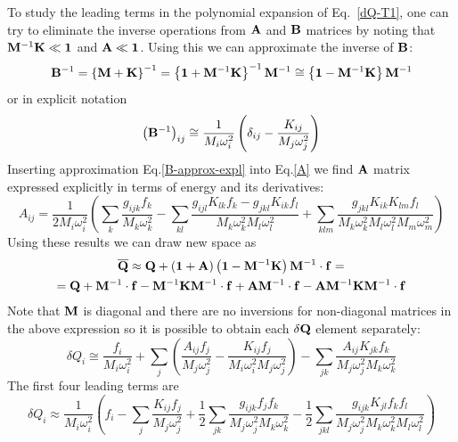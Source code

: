 \documentclass[a4paper,titlepage,twoside,fleqn,12pt]{book}
\begin{document}
\begin{refsection}
To study the leading terms in the polynomial expansion of Eq.~\eqref{dQ-T1}, 
one can try to eliminate the inverse operations from ${\bf A}$ and ${\bf B}$ matrices by noting that
${\bf M}^{-1} {\bf K} \ll {\bf 1}$ and ${\bf A} \ll {\bf 1}$. 
Using this we can approximate the inverse of ${\bf B}$:
%
\begin{equation}\label{B-approx}
{\bf B}^{-1} = \left\{ {\bf M} + {\bf K} \right\}^{-1} 
= \left\{ {\bf 1} + {\bf M}^{-1}{\bf K} \right\}^{-1}{\bf M}^{-1}
\cong \left\{ {\bf 1} - {\bf M}^{-1}{\bf K} \right\}{\bf M}^{-1}
\end{equation}
%
or in explicit notation
%
\begin{equation}\label{B-approx-expl}
\left( {\bf B}^{-1} \right)_{ij} \cong
\frac{1}{M_i\omega_i^2} \left( \delta_{ij} - \frac{K_{ij}}{M_j\omega_j^2} \right)
\end{equation}
%
Inserting approximation Eq.\eqref{B-approx-expl} into Eq.\eqref{A} we find
${\bf A}$ matrix expressed explicitly in terms of energy and its derivatives:
%
\begin{equation}\label{A-approx-expl}
A_{ij} = \frac{1}{2M_i\omega_i^2} 
\left(
     \sum_k \frac{g_{ijk}f_k}{M_k\omega_k^2} -
     \sum_{kl} \frac{ g_{ijl} K_{lk} f_k - g_{jkl} K_{ik} f_l }
                    {M_k\omega_k^2 M_l\omega_l^2} +
     \sum_{klm} \frac{ g_{jkl} K_{ik} K_{lm} f_l }
                     {M_k\omega_k^2 M_l\omega_l^2 M_m\omega_m^2}
\right)
\end{equation}
%
Using these results we can draw new space as
\begin{multline}\label{Q-new-T2-approx}
{\bf \overline{Q}} \approx {\bf Q} + \left( {\bf 1} + {\bf A} \right) \left( {\bf 1} - {\bf M}^{-1}{\bf K} \right){\bf M}^{-1} \cdot {\bf f}
= \\
={\bf Q} + {\bf M}^{-1} \cdot {\bf f} - {\bf M}^{-1}{\bf K}{\bf M}^{-1}\cdot{\bf f}
+ {\bf A}{\bf M}^{-1}\cdot{\bf f} - {\bf A}{\bf M}^{-1}{\bf K}{\bf M}^{-1}\cdot{\bf f}
\end{multline}
%
Note that ${\bf M}$ is diagonal and there are no inversions 
for non-diagonal matrices in the above expression
so it is possible to obtain each $\delta{\bf Q}$
element separately:
%
\begin{equation}\label{dQ-approx-T1-expl}
\delta Q_i \cong \frac{f_i}{M_i\omega_i^2} + 
  \sum_j \left( 
         \frac{ A_{ij}f_j }{M_j\omega_j^2} - 
         \frac{ K_{ij}f_j }{M_i\omega_i^2 M_j\omega_j^2}
         \right) -
  \sum_{jk} \frac{ A_{ij} K_{jk} f_k }{M_j\omega_j^2 M_k\omega_k^2}
\end{equation}
%
The first four leading terms are
%
\begin{equation}\label{dQ-approx-T1-expl-lead}
\delta Q_i \approx 
\frac{1}{M_i\omega_i^2}
\left(
    f_i - \sum_j \frac{K_{ij}f_j}{M_j\omega_j^2} + 
    \frac{1}{2} \sum_{jk} \frac{g_{ijk}f_jf_k}{M_j\omega_j^2 M_k\omega_k^2} -
    \frac{1}{2} \sum_{jkl} \frac{g_{ijk}K_{jl}f_kf_l}{M_j\omega_j^2 M_k\omega_k^2 M_l\omega_l^2}
\right)
\end{equation}
%


\end{refsection}
\end{document}
